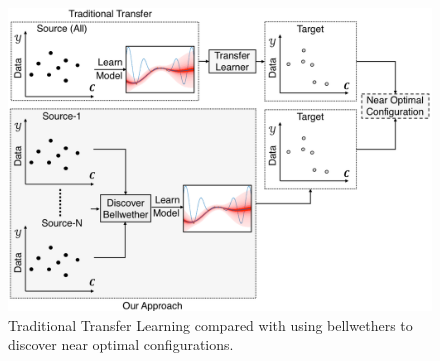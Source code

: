 \begin{figure}[t!]
    \centering
    \includegraphics[width=\linewidth]{figures/compare.png}
    \caption{Traditional Transfer Learning compared with using bellwethers to 
    discover near optimal configurations.}
    \label{fig:intro_fig}
\end{figure}